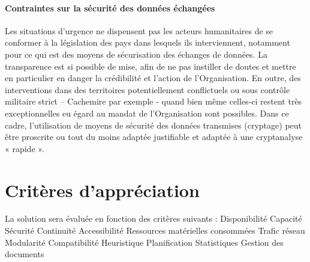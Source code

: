 \documentclass[11pt,fleqn]{book} %
\begin{document}
\paragraph{Contraintes sur la sécurité des données échangées}
Les situations d'urgence ne dispensent pas les acteurs humanitaires de se conformer à la législation des pays dans lesquels ils interviennent, notamment pour ce qui est des moyens de sécurisation des échanges de données. La transparence est si possible de mise, afin de ne pas instiller de doutes et mettre en particulier en danger la crédibilité et l'action de l'Organisation. En outre, des interventions dans des territoires potentiellement conflictuels ou sous contrôle militaire strict – Cachemire par exemple - quand bien même celles-ci restent très exceptionnelles eu égard au mandat de l'Organisation sont possibles. Dans ce cadre, l'utilisation de moyens de sécurité des données transmises (cryptage) peut être proscrite ou tout du moins adaptée justifiable et adaptée à une cryptanalyse « rapide ».

\section{Critères d'appréciation}
La solution sera évaluée en fonction des critères suivants :
Disponibilité
Capacité
Sécurité
Continuité
Accessibilité
Ressources matérielles consommées
Trafic réseau
Modularité
Compatibilité
Heuristique
Planification
Statistiques
Gestion des documents
\end{document}
